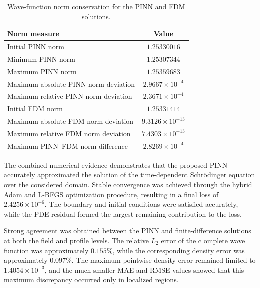 \documentclass[11pt]{article}
\begin{document}
\begin{table}[htbp]
	\centering
	\caption{Wave-function norm conservation for the PINN and FDM solutions.}
	\label{tab:norm_conservation}
	\begin{tabular}{lc}
		\hline
		\textbf{Norm measure} & \textbf{Value} \\
		\hline
		Initial PINN norm
		& \(1.25330016\) \\
		
		Minimum PINN norm
		& \(1.25307344\) \\
		
		Maximum PINN norm
		& \(1.25359683\) \\
		
		Maximum absolute PINN norm deviation
		& \(2.9667\times10^{-4}\) \\
		
		Maximum relative PINN norm deviation
		& \(2.3671\times10^{-4}\) \\
		
		Initial FDM norm
		& \(1.25331414\) \\
		
		Maximum absolute FDM norm deviation
		& \(9.3126\times10^{-13}\) \\
		
		Maximum relative FDM norm deviation
		& \(7.4303\times10^{-13}\) \\
		
		Maximum PINN--FDM norm difference
		& \(2.8269\times10^{-4}\) \\
		\hline
	\end{tabular}
	
\end{table}


The combined numerical evidence demonstrates that the proposed PINN 
accurately approximated the solution of the time-dependent Schrödinger 
equation over the considered domain. Stable convergence was achieved 
through the hybrid Adam and L-BFGS optimization procedure, resulting 
in a final loss of \(2.4256\times10^{-6}\). The boundary and initial 
conditions were satisfied accurately, while the PDE residual formed 
the largest remaining contribution to the loss.

Strong agreement was obtained between the PINN and finite-difference 
solutions at both the field and profile levels. The relative \(L_2\) error of the c
omplete wave function was approximately \(0.155\%\), while the corresponding density 
error was approximately \(0.097\%\). The maximum pointwise density error remained 
limited to \(1.4054\times10^{-3}\), and the much smaller MAE and RMSE values showed 
that this maximum discrepancy occurred only in localized regions.
\end{document}
